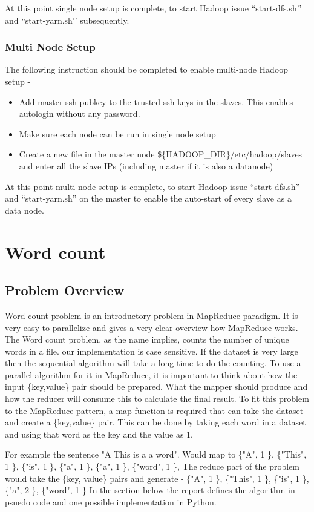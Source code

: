 \documentclass{article}
\begin{document}
At this point single node setup is complete, to start Hadoop issue ``start-dfs.sh’’ and ``start-yarn.sh’’ subsequently.

\subsubsection{Multi Node Setup}
The following instruction should be completed to enable multi-node Hadoop setup -
\begin{itemize}
\item Add master ssh-pubkey to the trusted ssh-keys in the slaves. This enables autologin without any password.
\item Make sure each node can be run in single node setup
\item Create a new file in the master node  \$\{HADOOP\_DIR\}/etc/hadoop/slaves and enter all the slave IPs (including master if it is also a datanode)
\end{itemize}

At this point multi-node setup is complete, to start Hadoop issue ``start-dfs.sh'' and ``start-yarn.sh'' on the master to enable the auto-start of every slave as a data node.

\section{Word count}
\subsection{Problem Overview}
Word count problem is an introductory problem in MapReduce paradigm. It is very easy to parallelize and gives a very clear overview how MapReduce works.
\BlankLine The Word count problem, as the name implies, counts the number of unique words in a file. our implementation is case sensitive. If the dataset is very large then the sequential algorithm will take a long time to do the counting.
To use a parallel algorithm for it in MapReduce, it is important to think about how the input \{key,value\} pair should be prepared. What the mapper should produce and how the reducer will consume this to calculate the final result.
To fit this problem to the MapReduce pattern, a map function is required that can take the dataset and create a \{key,value\} pair.
This can be done by taking each word in a dataset and using that word as the key and the value as 1.

 For example the sentence "A This is a a word". Would map to
 \BlankLine \{"A", 1 \}, \{"This", 1 \}, \{"is", 1 \}, \{"a", 1 \}, \{"a", 1 \}, \{"word", 1 \}, \BlankLine The reduce part of the problem would take the \{key, value\} pairs and generate -
\BlankLine \{"A", 1 \}, \{"This", 1 \}, \{"is", 1 \}, \{"a", 2 \}, \{"word", 1 \}
\BlankLine In the section below the report defines the algorithm in psuedo code and one possible implementation in Python.
\end{document}
